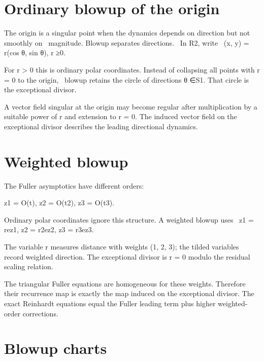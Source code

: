 \section{Ordinary blowup of the origin}

\begin{displaytext}
The origin is a singular point when the dynamics depends on direction but not smoothly on \
magnitude. Blowup separates directions. \
In R2, write \
(x, y) = r(cos θ, sin θ), r ≥0.
\end{displaytext}

\begin{displaytext}
For r > 0 this is ordinary polar coordinates. Instead of collapsing all points with r = 0 to the origin, \
blowup retains the circle of directions θ ∈S1. That circle is the exceptional divisor.
\end{displaytext}

A vector field singular at the origin may become regular after multiplication by a suitable power of r and extension to r = 0. The induced vector field on the exceptional divisor describes the leading directional dynamics.


\section{Weighted blowup}

The Fuller asymptotics have different orders:


\begin{displaytext}
z1 = O(t), z2 = O(t2), z3 = O(t3).
\end{displaytext}

\begin{displaytext}
Ordinary polar coordinates ignore this structure. A weighted blowup uses \
z1 = rez1, z2 = r2ez2, z3 = r3ez3.
\end{displaytext}

The variable r measures distance with weights (1, 2, 3); the tilded variables record weighted direction. The exceptional divisor is r = 0 modulo the residual scaling relation.


The triangular Fuller equations are homogeneous for these weights. Therefore their recurrence map is exactly the map induced on the exceptional divisor. The exact Reinhardt equations equal the Fuller leading term plus higher weighted-order corrections.


\section{Blowup charts}

